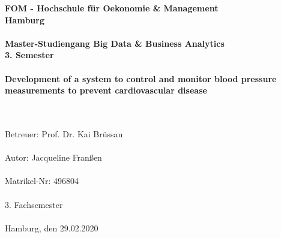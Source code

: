 		\begin{titlepage}
			\begin{center}
			\renewcommand{\baselinestretch}{1.5}
					\textbf{\large FOM - Hochschule für Oekonomie \& Management \\
						Hamburg \\
						\ \\
						Master-Studiengang Big Data \& Business Analytics \\
						3. Semester \\
						\ \\
						Development of a system to control and monitor blood pressure \ \\
						measurements to prevent cardiovascular disease \ \\
						\ \\
						}
						
					\textrm{
						\ \\
						Betreuer: Prof. Dr. Kai Brüssau \\
						\ \\
						Autor: Jacqueline Franßen \\
						\ \\
						Matrikel-Nr: 496804 \\
						\ \\
						3. Fachsemester \\
						\ \\
						Hamburg, den 29.02.2020 \\
						}
			\end{center}
		\end{titlepage}

%

			\setcounter{tocdepth}{3}
			\setcounter{secnumdepth}{3}		
			\thispagestyle{empty}
			\tableofcontents
			\newpage
			\listoffigures
			\listoftables

			\thispagestyle{empty}